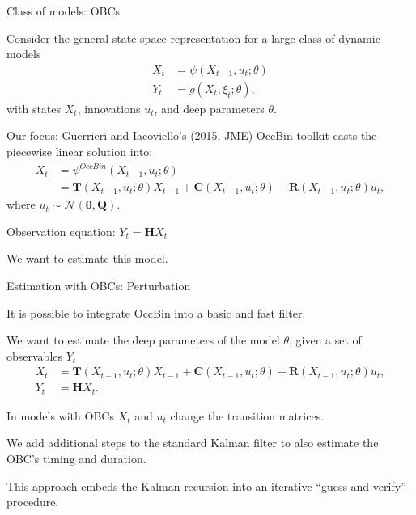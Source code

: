 

\begin{frame}{Class of models: OBCs}
\begin{wideitemize}
\item Consider the general state-space representation for a large class of dynamic models 
\begin{align*}
X_t &= \psi\left(X_{t-1},u_t;\theta\right)\\
Y_t &= g\left(X_t,\xi_t;\theta\right),
\end{align*}
with states $X_t$, innovations $u_t$, and deep parameters $\theta$.
\item Our focus: Guerrieri and Iacoviello's (2015, JME) OccBin toolkit casts the piecewise linear solution into:
\begin{align*}
X_t &= \psi^{OccBin}\left(X_{t-1},u_t;\theta\right)\\
&= \mathbf{T}(X_{t-1},u_t;\theta)X_{t-1}+\mathbf{C}(X_{t-1},u_t;\theta)+\mathbf{R}(X_{t-1},u_t;\theta)u_t,
\end{align*}
where $u_t \sim \mathcal{N}(\mathbf{0},\mathbf{Q})$.
\item Observation equation: $Y_t=\mathbf{H} X_t$
\item We want to estimate this model. 
\end{wideitemize}
\end{frame}

\begin{frame}{Estimation with OBCs: Perturbation}
\begin{wideitemize}
\item It is possible to integrate OccBin into a basic and fast filter.
\item We want to estimate the deep parameters of the model $\theta$, given a set of observables $Y_t$
\begin{align*}
    X_t &= \mathbf{T}(X_{t-1},u_t;\theta)X_{t-1}+\mathbf{C}(X_{t-1},u_t;\theta)+\mathbf{R}(X_{t-1},u_t;\theta)u_t,\\
    Y_t&=\mathbf{H} X_t. 
\end{align*}
\item In models with OBCs $X_t$ and $u_t$ change the transition matrices. 
\item  We add additional steps to the standard Kalman filter to also estimate the OBC’s timing and duration.
\item This approach embeds the Kalman recursion into an iterative ``guess and verify''-procedure.
\end{wideitemize}
\end{frame}

